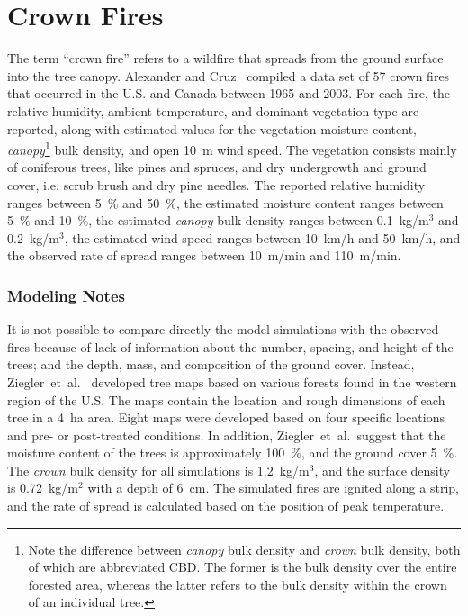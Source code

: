 \section{Crown Fires}
\label{Crown_Fires_Description}

The term ``crown fire'' refers to a wildfire that spreads from the ground surface into the tree canopy. Alexander and Cruz~\cite{Alexander:CJFR2006} compiled a data set of 57 crown fires that occurred in the U.S. and Canada between 1965 and 2003. For each fire, the relative humidity, ambient temperature, and dominant vegetation type are reported, along with estimated values for the vegetation moisture content, {\em canopy}\footnote{Note the difference between {\em canopy} bulk density and {\em crown} bulk density, both of which are abbreviated CBD. The former is the bulk density over the entire forested area, whereas the latter refers to the bulk density within the crown of an individual tree.} bulk density, and open 10~m wind speed. The vegetation consists mainly of coniferous trees, like pines and spruces, and dry undergrowth and ground cover, i.e. scrub brush and dry pine needles. The reported relative humidity ranges between 5~\% and 50~\%, the estimated moisture content ranges between 5~\% and 10~\%, the estimated {\em canopy} bulk density ranges between 0.1~kg/m$^3$ and 0.2~kg/m$^3$, the estimated wind speed ranges between 10~km/h and 50~km/h, and the observed rate of spread ranges between 10~m/min and 110~m/min.

\subsubsection{Modeling Notes}

It is not possible to compare directly the model simulations with the observed fires because of lack of information about the number, spacing, and height of the trees; and the depth, mass, and composition of the ground cover. Instead, Ziegler~et~al.~\cite{Ziegler:thesis,Ziegler:FEM2017,Ziegler:Data2019,Hoffman:FT2016} developed tree maps based on various forests found in the western region of the U.S. The maps contain the location and rough dimensions of each tree in a 4~ha area. Eight maps were developed based on four specific locations and pre- or post-treated conditions. In addition, Ziegler~et~al.~suggest that the moisture content of the trees is approximately 100~\%, and the ground cover 5~\%. The {\em crown} bulk density for all simulations is 1.2~kg/m$^3$, and the surface density is 0.72~kg/m$^2$ with a depth of 6~cm. The simulated fires are ignited along a strip, and the rate of spread is calculated based on the position of peak temperature.

